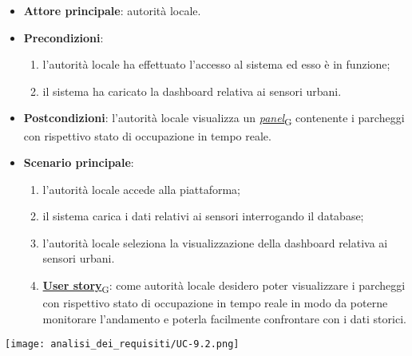 \begin{itemize}
	\item \textbf{Attore principale}: autorità locale.
	\item \textbf{Precondizioni}:
	      \begin{enumerate}
		      \item l'autorità locale ha effettuato l'accesso al sistema ed esso è in funzione;
		      \item il sistema ha caricato la dashboard relativa ai sensori urbani.
	      \end{enumerate}
	\item \textbf{Postcondizioni}: l'autorità locale visualizza un \href{https://7last.github.io/docs/pb/documentazione-interna/glossario\#panel}{\textit{panel}\textsubscript{G}} contenente i parcheggi con rispettivo stato di occupazione in tempo reale.
	\item \textbf{Scenario principale}:
	      \begin{enumerate}
		      \item l'autorità locale accede alla piattaforma;
		      \item il sistema carica i dati relativi ai sensori interrogando il database;
		      \item l'autorità locale seleziona la visualizzazione della dashboard relativa ai sensori urbani.
	\item \href{https://7last.github.io/docs/pb/documentazione-interna/glossario\#user-story}{\textbf{User story}\textsubscript{G}}:
	      come autorità locale desidero poter visualizzare i parcheggi con rispettivo stato di occupazione in tempo reale in modo da poterne monitorare l'andamento
	      e poterla facilmente confrontare con i dati storici.
		  \end{enumerate}
\end{itemize}
\begin{center}
	\texttt{[image: analisi\_dei\_requisiti/UC-9.2.png]}
\end{center}


